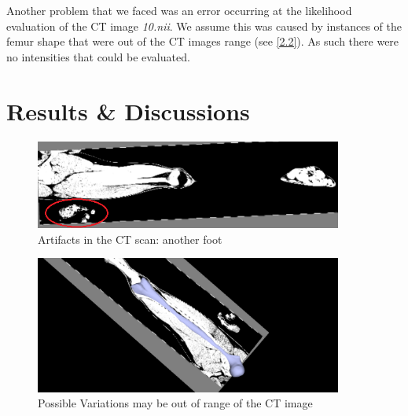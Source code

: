 \documentclass{article}
\begin{document}
	Another problem that we faced was an error occurring at the likelihood evaluation of the CT image \textit{10.nii}. We assume this was caused by instances of the femur shape that were out of the CT images range (see \autoref{2.2}). As such there were no intensities that could be evaluated. 
	
	\section{Results \& Discussions}
		\begin{figure}
			\centering
			\includegraphics[width=0.9\textwidth]{images/CT_10_foot.png}
			\caption{Artifacts in the CT scan: another foot}
			\label{2.1}
		\end{figure}		
		\begin{figure}
			\centering
			\includegraphics[width=0.9\textwidth]{images/segmentation_10_outofrange.png}
			\caption{Possible Variations may be out of range of the CT image}
			\label{2.2}
		\end{figure}
	
\end{document}
